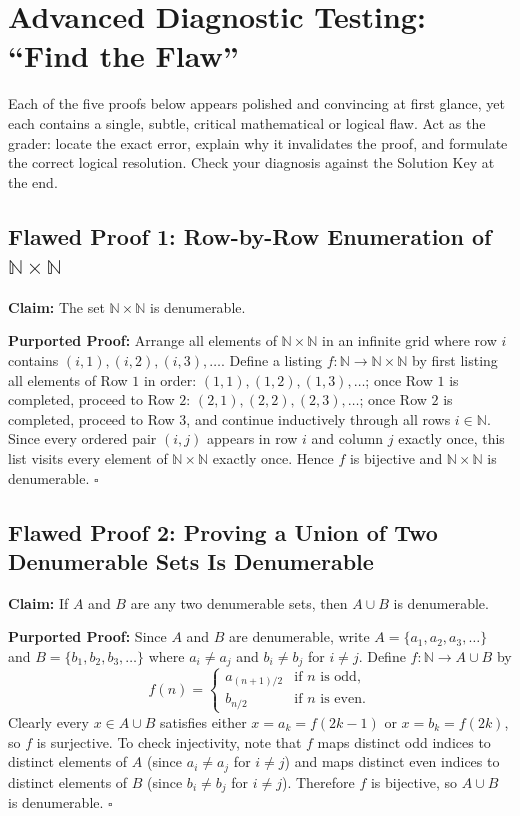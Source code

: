 \documentclass[11pt, letterpaper]{article}
\theoremstyle{definition}
\theoremstyle{remark}
\begin{document}
\section{Advanced Diagnostic Testing: ``Find the Flaw''}

Each of the five proofs below appears polished and convincing at first glance, yet each contains a single, subtle, critical mathematical or logical flaw. Act as the grader: locate the exact error, explain why it invalidates the proof, and formulate the correct logical resolution. Check your diagnosis against the Solution Key at the end.

\subsection{Flawed Proof 1: Row-by-Row Enumeration of $\mathbb{N} \times \mathbb{N}$}

\textbf{Claim:} The set $\mathbb{N} \times \mathbb{N}$ is denumerable.

\textbf{Purported Proof:} Arrange all elements of $\mathbb{N} \times \mathbb{N}$ in an infinite grid where row $i$ contains $(i, 1), (i, 2), (i, 3), \dots$. Define a listing $f : \mathbb{N} \to \mathbb{N} \times \mathbb{N}$ by first listing all elements of Row $1$ in order: $(1, 1), (1, 2), (1, 3), \dots$; once Row $1$ is completed, proceed to Row $2$: $(2, 1), (2, 2), (2, 3), \dots$; once Row $2$ is completed, proceed to Row $3$, and continue inductively through all rows $i \in \mathbb{N}$. Since every ordered pair $(i, j)$ appears in row $i$ and column $j$ exactly once, this list visits every element of $\mathbb{N} \times \mathbb{N}$ exactly once. Hence $f$ is bijective and $\mathbb{N} \times \mathbb{N}$ is denumerable. $\square$

\subsection{Flawed Proof 2: Proving a Union of Two Denumerable Sets Is Denumerable}

\textbf{Claim:} If $A$ and $B$ are any two denumerable sets, then $A \cup B$ is denumerable.

\textbf{Purported Proof:} Since $A$ and $B$ are denumerable, write $A = \{a_1, a_2, a_3, \dots\}$ and $B = \{b_1, b_2, b_3, \dots\}$ where $a_i \neq a_j$ and $b_i \neq b_j$ for $i \neq j$. Define $f : \mathbb{N} \to A \cup B$ by
\[
f(n) = \begin{cases}
a_{(n+1)/2} & \text{if } n \text{ is odd}, \\[4pt]
b_{n/2} & \text{if } n \text{ is even}.
\end{cases}
\]
Clearly every $x \in A \cup B$ satisfies either $x = a_k = f(2k-1)$ or $x = b_k = f(2k)$, so $f$ is surjective. To check injectivity, note that $f$ maps distinct odd indices to distinct elements of $A$ (since $a_i \neq a_j$ for $i \neq j$) and maps distinct even indices to distinct elements of $B$ (since $b_i \neq b_j$ for $i \neq j$). Therefore $f$ is bijective, so $A \cup B$ is denumerable. $\square$
\end{document}
